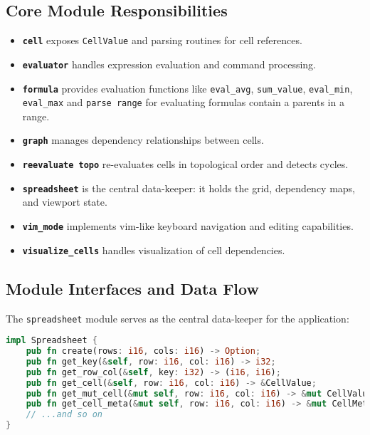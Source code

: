 \documentclass[11pt,a4paper]{article}
\begin{document}
\subsection{Core Module Responsibilities}

\begin{itemize}
  \item \textbf{\texttt{cell}} exposes \lstinline{CellValue} and parsing routines for cell references.
  \item \textbf{\texttt{evaluator}} handles expression evaluation and command processing.
  \item \textbf{\texttt{formula}} provides evaluation functions like \lstinline{eval_avg}, \lstinline{sum_value}, \lstinline{eval_min},  \lstinline{eval_max} and \lstinline{parse range} for evaluating formulas contain a parents in a range.
  \item \textbf{\texttt{graph}} manages dependency relationships between cells.
  \item \textbf{\texttt{reevaluate topo}} re-evaluates cells in topological order and detects cycles.
  \item \textbf{\texttt{spreadsheet}} is the central data-keeper: it holds the grid, dependency maps, and viewport state.
  \item \textbf{\texttt{vim\_mode}} implements vim-like keyboard navigation and editing capabilities.
  \item \textbf{\texttt{visualize\_cells}} handles visualization of cell dependencies.
\end{itemize}

\subsection{Module Interfaces and Data Flow}

The \texttt{spreadsheet} module serves as the central data-keeper for the application:

\begin{lstlisting}[language=Rust, caption={Spreadsheet}, label=lst:spreadsheet-api]
impl Spreadsheet {
    pub fn create(rows: i16, cols: i16) -> Option;
    pub fn get_key(&self, row: i16, col: i16) -> i32;
    pub fn get_row_col(&self, key: i32) -> (i16, i16);
    pub fn get_cell(&self, row: i16, col: i16) -> &CellValue;
    pub fn get_mut_cell(&mut self, row: i16, col: i16) -> &mut CellValue;
    pub fn get_cell_meta(&mut self, row: i16, col: i16) -> &mut CellMeta;
    // ...and so on
}
\end{lstlisting}
\end{document}
